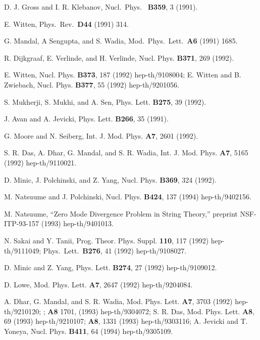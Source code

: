 \begin{thebibliography}{99}
 D. J. Gross and I. R. Klebanov,  Nucl.~Phys.~{\bf
B359}, 3 (1991).

 E. Witten, Phys.~Rev.~{\bf D44} (1991) 314.

 G. Mandal, A Sengupta, and S. Wadia,
Mod.~Phys.~Lett.~{\bf A6} (1991) 1685.

 R. Dijkgraaf, E. Verlinde, and H. Verlinde,
Nucl. Phys. {\bf B371}, 269 (1992).

 E. Witten, Nucl. Phys. {\bf B373}, 187 (1992) hep-th/9108004;
E. Witten and B. Zwiebach, Nucl. Phys. {\bf B377}, 55
(1992) hep-th/9201056.

 S. Mukherji, S. Mukhi, and A. Sen,
Phys. Lett. {\bf B275}, 39 (1992).  

 J. Avan and A. Jevicki, Phys. Lett. {\bf B266}, 35
(1991).

 G. Moore and N. Seiberg,
Int. J. Mod. Phys. {\bf A7}, 2601 (1992).

 S. R. Das, A. Dhar, G. Mandal, and S. R. Wadia,
Int. J. Mod. Phys. {\bf A7}, 5165 (1992) hep-th/9110021.

 D. Minic, J. Polchinski,
and Z. Yang, Nucl. Phys. {\bf B369}, 324 (1992).

 M. Natsuume and J. Polchinski, Nucl. Phys. {\bf
B424}, 137 (1994) hep-th/9402156. 

 M. Natsuume, ``Zero Mode Divergence Problem in String
Theory,'' preprint NSF-ITP-93-157 (1993) hep-th/9401013.

 N. Sakai and Y. Tanii, Prog. Theor. Phys. Suppl.
{\bf 110}, 117 (1992) hep-th/9111049;
Phys.~Lett.~{\bf B276}, 41 (1992) hep-th/9108027.

 D. Minic and Z. Yang,
Phys. Lett. {\bf B274}, 27 (1992) hep-th/9109012.

 D. Lowe,
Mod. Phys. Lett. {\bf A7}, 2647 (1992) hep-th/9204084.

 A. Dhar, G. Mandal, and S. R. Wadia,
Mod. Phys. Lett. {\bf A7}, 3703 (1992) hep-th/9210120;
; {\bf A8} 1701, (1993) hep-th/9304072;
S. R. Das, Mod. Phys. Lett. {\bf A8}, 69 (1993) hep-th/9210107;
{\bf A8}, 1331 (1993) hep-th/9303116;
A. Jevicki and T. Yoneya, Nucl. Phys. {\bf B411}, 64 (1994)
hep-th/9305109.

\end{thebibliography}
 



